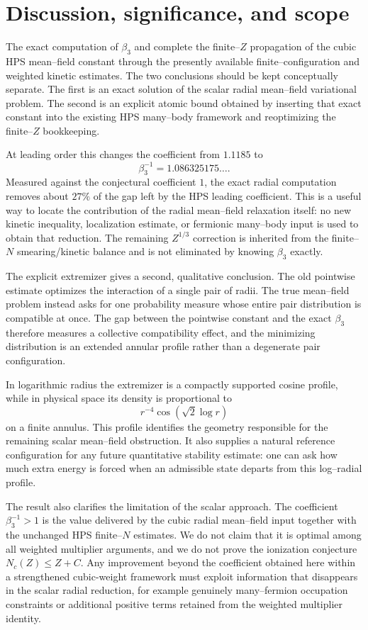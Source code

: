 \section{Discussion, significance, and scope}\label{sec:outlook}

The exact computation of $\beta_3$ and  complete the finite--$Z$ propagation of the cubic HPS mean--field constant through the presently available finite--configuration and weighted kinetic estimates.  The two conclusions should be kept conceptually separate.  The first is an exact solution of the scalar radial mean--field variational problem.  The second is an explicit atomic bound obtained by inserting that exact constant into the existing HPS many--body framework and reoptimizing the finite--$Z$ bookkeeping.

At leading order this changes the coefficient from $1.1185$ to
\[
 \beta_3^{-1}=1.086325175\ldots .
\]
Measured against the conjectural coefficient $1$, the exact radial computation removes about $27\%$ of the gap left by the HPS leading coefficient.  This is a useful way to locate the contribution of the radial mean--field relaxation itself: no new kinetic inequality, localization estimate, or fermionic many--body input is used to obtain that reduction.  The remaining $Z^{1/3}$ correction is inherited from the finite--$N$ smearing/kinetic balance and is not eliminated by knowing $\beta_3$ exactly.

The explicit extremizer gives a second, qualitative conclusion.  The old pointwise estimate optimizes the interaction of a single pair of radii.  The true mean--field problem instead asks for one probability measure whose entire pair distribution is compatible at once.  The gap between the pointwise constant and the exact $\beta_3$ therefore measures a collective compatibility effect, and the minimizing distribution is an extended annular profile rather than a degenerate pair configuration.

In logarithmic radius the extremizer is a compactly supported cosine profile, while in physical space its density is proportional to
\[
 r^{-4}\cos(\sqrt2\log r)
\]
on a finite annulus.  This profile identifies the geometry responsible for the remaining scalar mean--field obstruction.  It also supplies a natural reference configuration for any future quantitative stability estimate: one can ask how much extra energy is forced when an admissible state departs from this log--radial profile.

The result also clarifies the limitation of the scalar approach.  The coefficient $\beta_3^{-1}>1$ is the value delivered by the cubic radial mean--field input together with the unchanged HPS finite--$N$ estimates.  We do not claim that it is optimal among all weighted multiplier arguments, and we do not prove the ionization conjecture $N_c(Z)\le Z+C$.  Any improvement beyond the coefficient obtained here within a strengthened cubic-weight framework must exploit information that disappears in the scalar radial reduction, for example genuinely many--fermion occupation constraints or additional positive terms retained from the weighted multiplier identity.

